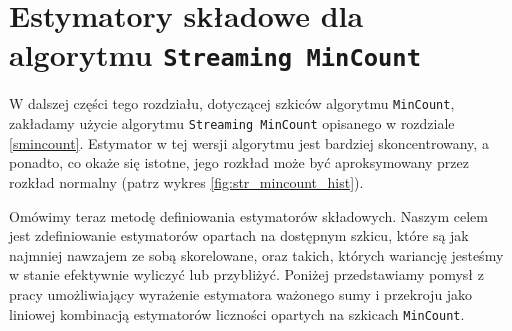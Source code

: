 \section{Estymatory składowe dla algorytmu \texttt{Streaming MinCount}}

W dalszej części tego rozdziału, dotyczącej szkiców algorytmu \texttt{MinCount}, zakładamy użycie algorytmu \texttt{Streaming MinCount} opisanego w rozdziale \ref{smincount}.
Estymator w tej wersji algorytmu jest bardziej skoncentrowany, a ponadto, co okaże się istotne, jego rozkład może być aproksymowany przez rozkład normalny (patrz wykres \ref{fig:str_mincount_hist}). 

Omówimy teraz metodę  definiowania estymatorów składowych. Naszym celem jest zdefiniowanie estymatorów opartach na dostępnym szkicu, które są jak najmniej nawzajem ze sobą skorelowane, oraz takich, których wariancję jesteśmy w stanie efektywnie wyliczyć lub przybliżyć. Poniżej przedstawiamy pomysł z pracy \cite{ting} umożliwiający wyrażenie estymatora ważonego sumy i przekroju jako  liniowej kombinacją  estymatorów liczności opartych na szkicach \texttt{MinCount}.


